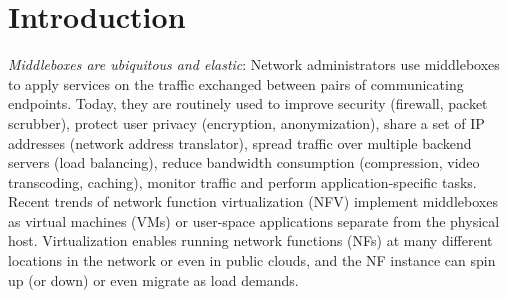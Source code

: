  \begin{comment}
\section{Motivation}

Today's Internet can move at any  point. The soaring demands of client
mobility  over   the  last two decades,    the   growing elasticity of
virtualized server, and the  recent trends of elastic network function
virtualiztion,   impose  new challenges   for  network  infrastructure
design.


Many mobility  solutions rely on  an  artificial choke-point,  such as
name server or home agent, which  are installed as middleboxes in many
places. Recent trends of network  function virtualization aim to offer
a more scalable and flexible middlebox functions, and network function
migration can happen at any  time. We raise  a question, can we have a
unified solution that can support every point (e.g., endhosts, network
functions, server VMs) moving in the network?

Although previous approaches consider some of  the problem we address,
none addresses all this issues in a unifying solution.

\end{comment}
 

\section{Introduction}

\textit{Middleboxes    are   ubiquitous     and   elastic}:    Network
administrators   use middleboxes to     apply services on the  traffic
exchanged  between pairs of  communicating  endpoints. Today, they are
routinely  used   to improve  security   (firewall,  packet scrubber),
protect  user privacy (encryption,  anonymization),  share a set of IP
addresses (network address  translator), spread traffic over  multiple
backend  servers  (load   balancing),   reduce  bandwidth  consumption
(compression, video transcoding, caching), monitor traffic and perform
application-specific    tasks.   Recent trends   of network   function
virtualization (NFV) implement   middleboxes  as virtual  machines (VMs)  or
user-space  applications separate     from   the  physical      host.
Virtualization enables running network functions (NFs) at many different locations
in the  network or even in public  clouds, and the  NF instance
can spin up (or down) or even migrate as load demands.

